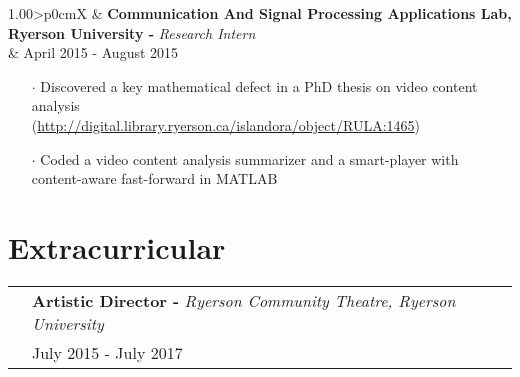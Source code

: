 \documentclass[a4paper, oneside, final]{scrartcl} %
\newcommand{\gray}{\rowcolor[gray]{.90}} %
\begin{document}
\begin{center}
\begin{itemize}
  \end{itemize}

  \vspace{-0.05cm}

  \begin{tabularx}{1.00\linewidth}{>{\raggedleft\scshape}p{0cm}X}
    \gray & \textbf{Communication And Signal Processing Applications Lab, Ryerson University -} \textit{Research Intern}\\
    \gray & {April 2015 - August 2015}\\
  \end{tabularx}
  \vspace{-0.2cm}
  \begin{itemize}\itemsep-0.2cm
      \vspace{-0.1cm}

    \item[$\cdot$] Discovered a key mathematical defect in a PhD thesis on video content analysis \\(\url{http://digital.library.ryerson.ca/islandora/object/RULA:1465})\\
    \item[$\cdot$] Coded a video content analysis summarizer and a smart-player with content-aware fast-forward in MATLAB\\

  \end{itemize}

  \section{Extracurricular}

  \renewcommand{\arraystretch}{1.3}
  \vspace{-0.05cm}

  \begin{tabularx}{1.00\linewidth}{>{\raggedleft\scshape}p{0cm}X}
    \gray & \textbf{Artistic Director -} \textit{Ryerson Community Theatre, Ryerson University}\\
    \gray & {July 2015 - July 2017}\\
  \end{tabularx}
  \vspace{-0.2cm}
  \begin{itemize} \itemsep-0.2cm
      \vspace{-0.1cm}


\end{itemize}
\end{center}
\end{document}

